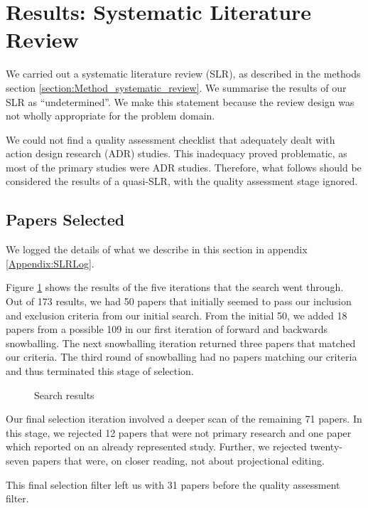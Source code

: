 \section{Results: Systematic Literature Review}
\label{section:Results_SLR}

We carried out a systematic literature review (SLR), as described in the methods section \ref{section:Method_systematic_review}.
We summarise the results of our SLR as ``undetermined''.
We make this statement because the review design was not wholly appropriate for the problem domain.

We could not find a quality assessment checklist that adequately dealt with action design research (ADR) studies.
This inadequacy proved problematic, as most of the primary studies were ADR studies.
Therefore, what follows should be considered the results of a quasi-SLR, with the quality assessment stage ignored.

\subsection{Papers Selected}
We logged the details of what we describe in this section in appendix \ref{Appendix:SLRLog}.

Figure \ref{fig:search_results} shows the results of the five iterations that the search went through.
Out of 173 results, we had 50 papers that initially seemed to pass our inclusion and exclusion criteria from our initial search.
From the initial 50, we added 18 papers from a possible 109 in our first iteration of forward and backwards snowballing.
The next snowballing iteration returned three papers that matched our criteria.
The third round of snowballing had no papers matching our criteria and thus terminated this stage of selection.

\begin{figure}[htbp]
    \centering
    \caption{Search results}
    \label{fig:search_results}
\end{figure}


Our final selection iteration involved a deeper scan of the remaining 71 papers.
In this stage, we rejected 12 papers that were not primary research and one paper which reported on an already represented study.
Further, we rejected twenty-seven papers that were, on closer reading, not about projectional editing.

This final selection filter left us with 31 papers before the quality assessment filter.

